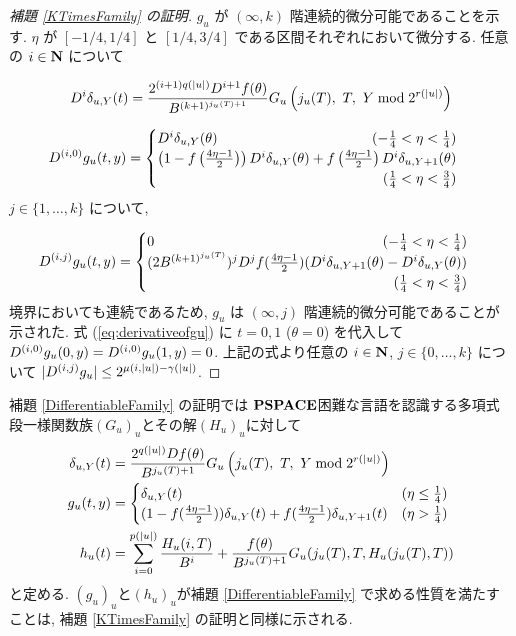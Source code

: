 \begin{proof}[\rm 補題 \ref{KTimesFamily} の証明]
  $g_u$ が $(\infty, k)$ 階連続的微分可能であることを示す.
  $\eta$ が $[-1/4, 1/4]$ と $[1/4, 3/4]$ である区間それぞれにおいて微分する.
  任意の $i \in \mathbf N$ について

  \begin{equation}
   D^i \delta_{u,Y}(t) 
    = \frac{2^{(i+1)q(|u|)} D^{i+1}f(\theta)}{B^{(k+1)^{j_u(T)+1}}}
    G_u\left( j_u(T),\ T,\ Y \bmod 2^{r(|u|)} \right)
  \end{equation}

  \begin{equation}
   \label{eq:derivativeofgu}
    \D^{(i,0)} g_u(t, y)
     = \begin{cases}
 	\D^i \delta_{u, Y}(\theta) 
	\hfill (- \frac 1 4 < \eta < \frac 1 4) \\
	\left( 1-f \left(\frac{4\eta-1}{2}\right)\right) 
	\D^i \delta_{u, Y}(\theta) 
	+ f \left(\frac{4\eta-1}{2}\right) \D^i \delta_{u,Y+1}(\theta) \\
	\hfill (\frac 1 4 < \eta < \frac 3 4)
       \end{cases}
  \end{equation}   
  $j \in \{1, \dots , k\}$ について,

  \begin{equation}
    \D^{(i,j)} g_u(t, y)
     = \begin{cases}
	0 \hfill (- \frac 1 4 < \eta < \frac 1 4) \\
	(2B^{(k+1)^{j_u(T)}})^j \D^j f(\frac{4\eta - 1}2)
	(\D^i \delta_{u,Y+1}(\theta)-\D^i \delta_{u, Y}(\theta)) \\
	\hfill (\frac 1 4 < \eta < \frac 3 4)
       \end{cases}
  \end{equation}
  境界においても連続であるため,
  $g_u$ は $(\infty, j)$ 階連続的微分可能であることが示された.
  式 (\ref{eq:derivativeofgu}) に $t = 0, 1$ ($\theta = 0$) を代入して
  $D^{(i, 0)} g_u(0,y) = D^{(i, 0)} g_u(1,y) = 0$.
  上記の式より任意の $i \in \mathbf N$, $j \in \{0, \dots, k\}$ について
  $|D^{(i,j)} g_u| \leq 2^{\mu(i, |u|) - \gamma(|u|)}$.

 \end{proof}

 補題 \ref{DifferentiableFamily} の証明では
 $\mathbf{PSPACE}$困難な言語を認識する多項式段一様関数族$(G_u)_u$とその解$(H_u)_u$に対して
 \begin{align}
  \delta_{u, Y} (t) &= \frac{2^{q(|u|)} D f(\theta)}{B^{{j_u(T)+1}}} 
   G_u\left( j_u(T),\ T,\ Y \bmod 2^{r(|u|)} \right)
  \\
  g_u(t,y) 
  &= \begin{cases}
     \delta_{u, Y}(t)
     & (\eta \le \frac 1 4)
     \\
     ( 1-f ( \frac{4\eta-1}{2})) \delta_{u, Y}(t) 
     + f ( \frac{4\eta-1}{2}) \delta_{u,Y+1}(t)
     & (\eta > \frac 1 4)
    \end{cases}
  \\
  h_u(t) &= \sum^{p(|u|)}_{i=0} \frac{H_u(i, T)}{B^{i}}  
  + \frac{f(\theta)}{B^{{j_u(T)+1}}} G_u(j_u(T), T, H_u(j_u(T), T)) 
 \end{align}
 と定める.
 $(g_u)_u$と$(h_u)_u$が補題 \ref{DifferentiableFamily} で求める性質を満たすことは,
 補題 \ref{KTimesFamily} の証明と同様に示される.


